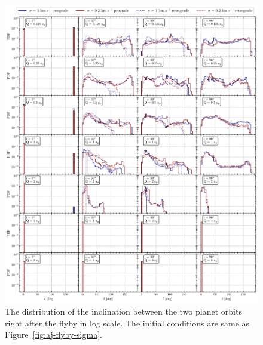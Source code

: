 \documentclass[twocolumn]{aastex63}
\newcommand*\fgr[1]{Figure~\ref{#1}}
\begin{document}
\begin{figure}
    \includegraphics[width=\textwidth]{figs/inc-flyby-sigma.pdf}
    \caption{The distribution of the inclination between the two planet orbits right after the flyby in log scale.  The initial conditions are same as \fgr{fig:aj-flyby-sigma}.}  
    \label{fig:inc-flyby-sigma}
\end{figure}
\end{document}

